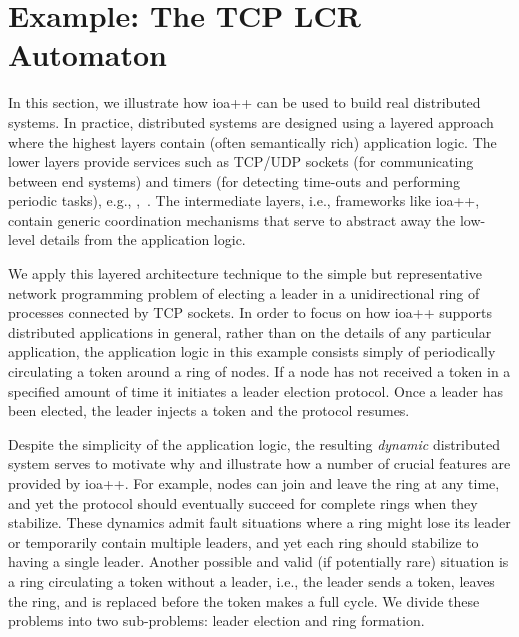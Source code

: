 \section{Example:  The TCP LCR Automaton\label{case_study}}

In this section, we illustrate how ioa++ can be used to build real distributed systems.
In practice, distributed systems are designed using a layered approach where the highest layers contain (often semantically rich) application logic.
The lower layers provide services such as TCP/UDP sockets (for communicating between end systems) and timers (for detecting time-outs and performing periodic tasks), e.g., \cite{schmidt2001c++},~\cite{schmidt2002c++}.
The intermediate layers, i.e., frameworks like ioa++, contain generic coordination mechanisms that serve to abstract away the low-level details from the application logic.

We apply this layered architecture technique to the simple but representative network programming problem of electing a leader in a unidirectional ring of processes connected by TCP sockets.  
In order to focus on how ioa++ supports distributed applications in general, rather than on the details of any
particular application, the application logic in this example consists simply of periodically circulating a token around a ring of nodes.
If a node has not received a token in a specified amount of time it initiates a leader election protocol.
Once a leader has been elected, the leader injects a token and the protocol resumes.

Despite the simplicity of the application logic, the resulting \emph{dynamic} distributed system serves to motivate why and illustrate how a number of crucial features are provided by ioa++.
For example, nodes can join and leave the ring at any time, and yet the protocol should eventually succeed for complete rings when they stabilize.
These dynamics admit fault situations where a ring might lose its leader or temporarily contain multiple leaders, and yet each ring should stabilize to having a single leader.
Another possible and valid (if potentially rare) situation is a ring circulating a token without a leader, i.e., the leader sends a token, leaves the ring, and is replaced before the token makes a full cycle.
We divide these problems into two sub-problems:  leader election and ring formation.

